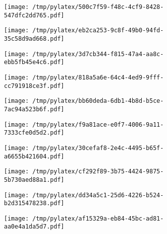 \documentclass{article}
\begin{document}
\begin{figure}[htbp]
\begin{subfigure}[b]{.3\linewidth}
\texttt{[image: /tmp/pylatex/500c7f59-f48c-4cf9-8428-547dfc2dd765.pdf]}
\end{subfigure}
\begin{subfigure}[b]{.3\linewidth}
\texttt{[image: /tmp/pylatex/eb2ca253-9c8f-49b0-94fd-35c58d9ad668.pdf]}
\end{subfigure}
\begin{subfigure}[b]{.3\linewidth}
\texttt{[image: /tmp/pylatex/3d7cb344-f815-47a4-aa8c-ebb5fb45e4c6.pdf]}
\end{subfigure}
\begin{subfigure}[b]{.3\linewidth}
\texttt{[image: /tmp/pylatex/818a5a6e-64c4-4ed9-9fff-cc791918ce3f.pdf]}
\end{subfigure}
\begin{subfigure}[b]{.3\linewidth}
\texttt{[image: /tmp/pylatex/bb60deda-6db1-4b8d-b5ce-7ac94a523b6f.pdf]}
\end{subfigure}
\begin{subfigure}[b]{.3\linewidth}
\texttt{[image: /tmp/pylatex/f9a81ace-e0f7-4006-9a11-7333cfe0d5d2.pdf]}
\end{subfigure}
\begin{subfigure}[b]{.3\linewidth}
\texttt{[image: /tmp/pylatex/30cefaf8-2e4c-4495-b65f-a6655b421604.pdf]}
\end{subfigure}
\begin{subfigure}[b]{.3\linewidth}
\texttt{[image: /tmp/pylatex/cf292f89-3b75-4424-9875-5b730aed88a1.pdf]}
\end{subfigure}
\begin{subfigure}[b]{.3\linewidth}
\texttt{[image: /tmp/pylatex/dd34a5c1-25d6-4226-b524-b2d315478238.pdf]}
\end{subfigure}
\begin{subfigure}[b]{.3\linewidth}
\texttt{[image: /tmp/pylatex/af15329a-eb84-45bc-ad81-aa0e4a1da5d7.pdf]}
\end{subfigure}
\end{figure}
\end{document}

